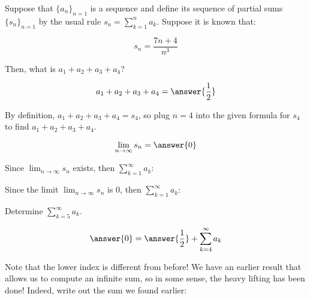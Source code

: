 \documentclass{ximera}
\author{Jim Talamo}
\begin{document}
\begin{exercise}
Suppose that $\{a_n\}_{n=1}$ is a sequence and define its sequence of partial sums $\{s_n\}_{n=1}$ by the usual rule $s_n = \sum_{k=1}^n a_k$.  Suppose it is known that:

\[
s_n = \frac{7n+4}{n^3}
\]

Then, what is $a_1+a_2+a_3+a_4$?

\[
a_1+a_2+a_3+a_4= \answer{\frac{1}{2}}
\]
\begin{hint}
By definition, $a_1+a_2 +a_3+a_4= s_4$, so plug $n=4$ into the given formula for $s_4$ to find $a_1+a_2+a_3+a_4$.
\end{hint}
\begin{exercise}
\[
\lim_{n \to \infty} s_n = \answer{0}
\]

\begin{exercise}
Since $\lim_{n \to \infty} s_n$ exists, then $\sum_{k=1}^{\infty} a_k$:


\begin{multipleChoice}
\end{multipleChoice}

Since the limit $\lim_{n \to \infty} s_n$ is $0$, then $\sum_{k=1}^{\infty} a_k$:
\begin{multipleChoice}
\end{multipleChoice}

\begin{exercise}
Determine $\sum_{k=5}^{\infty} a_k$.

\[
\answer{0} = \answer{\frac{1}{2}} + \sum_{k=4}^{\infty} a_k
\]


\begin{hint}
Note that the lower index is different from before!  We have an earlier result that allows us to compute an infinite sum, so in some sense, the heavy lifting has been done!  Indeed, write out the sum we found earlier:
\begin{image}
  \end{image}
\end{hint}


\end{exercise}
\end{exercise}
\end{exercise}
\end{exercise}
\end{document}
